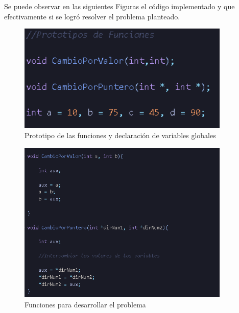 \documentclass[12pt,a4paper]{article}
\begin{document}
Se puede observar en las siguientes Figuras el código implementado y que efectivamente si se logró resolver el problema planteado.

\begin{figure}[H]
    \centering
    \center
    \includegraphics[width=0.9\textwidth]{Fotos_Lab6/Prototipo.png}
    \caption{Prototipo de las funciones y declaración de variables globales}
    \label{1}
\end{figure}

\begin{figure}[H]
    \centering
    \center
    \includegraphics[width=0.9\textwidth]{Fotos_Lab6/Funciones.png}
    \caption{Funciones para desarrollar el problema}
    \label{1}
\end{figure}
\end{document}
